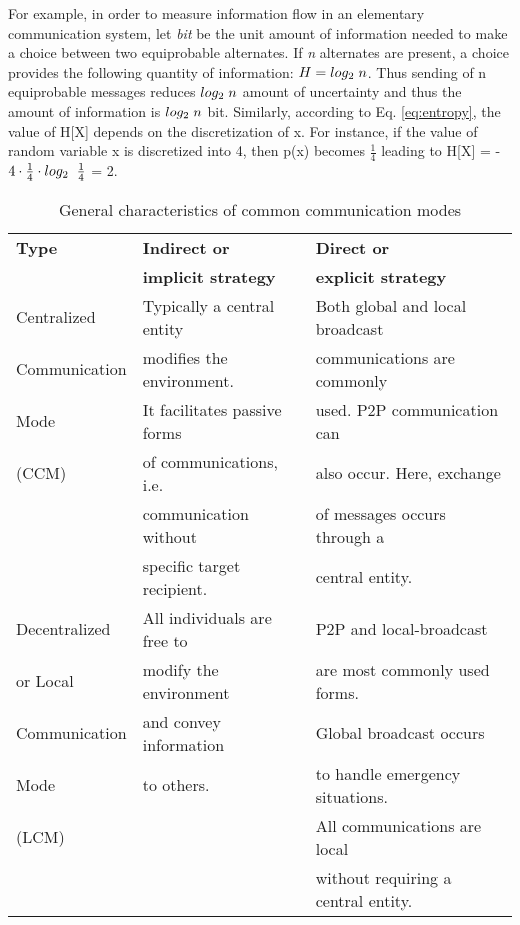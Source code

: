 For example, in order to measure information flow in an elementary communication system, let {\em bit} be the unit amount of information needed to make a choice between two equiprobable alternates. If {\em n} alternates are present, a choice provides the following quantity of information: $H = log_{2} \hspace{1mm} n $. Thus sending of n equiprobable messages reduces $log_{2} \hspace{1mm} n $ amount of uncertainty and thus the amount of information is  $log_{2} \hspace{1mm} n $ bit.  Similarly, according to Eq. \ref{eq:entropy}, the value of H[X] depends on the discretization of x. For instance, if the value of random variable x is discretized into 4, then p(x) becomes $\frac{1}{4}$  leading to H[X] = - $ 4 \cdot \frac{1}{4} \cdot log_{2} \hspace{2mm} \frac{1}{4}$  = 2.\\
\begin{table}
\caption{General characteristics of common communication modes}
\label{table:comm-classify}
\begin{center}
\begin{tabular}{|l|l|l|}
\hline \textbf{Type} & \textbf{Indirect or} & \textbf{Direct or }\\
& \textbf{implicit strategy} & \textbf{explicit strategy}\\
\hline Centralized & Typically a central entity   & Both global and local broadcast  \\
Communication & modifies the environment. & communications are commonly\\
Mode & It facilitates passive forms  &  used. P2P  communication can \\
(CCM)  &  of communications, i.e.     & also occur. Here, exchange\\
&  communication without   &    of messages  occurs through a\\
& specific target recipient. &  central entity.\\
\hline Decentralized & All individuals are free to & P2P and local-broadcast \\
or Local & modify the environment &  are  most commonly used forms. \\
Communication & and convey information &  Global broadcast occurs \\
Mode & to others. & to handle emergency situations. \\
(LCM) & & All communications are local\\
& & without requiring a central entity.\\
\hline
\end{tabular}
\end{center}
\end{table}
